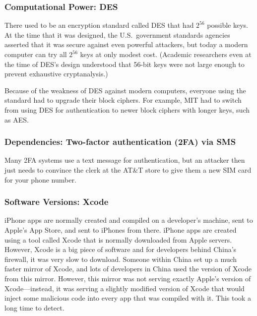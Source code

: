 \subsubsection{Computational Power: DES}
There used to be an encryption standard called DES that had $2^{56}$ possible keys.
At the time that it was designed, the U.S.~government standards agencies asserted that it was
secure against even powerful attackers,
but today a modern computer can try all $2^{56}$ keys at only modest cost.
(Academic researchers even at the time of DES's
design understood that 56-bit keys were not large
enough to prevent exhaustive
cryptanalysis.\cite{DH77})

Because of the weakness of DES against modern computers,
everyone using the standard had to upgrade their block ciphers.
For example, MIT had to switch from using DES for authentication 
to newer block ciphers with longer keys, such as AES.

\subsubsection{Dependencies: Two-factor authentication (2FA) via SMS}
Many 2FA systems use a text message for authentication, but an attacker then
just needs to convince the clerk at the AT\&T store to give them a new SIM card for your phone number.

\subsubsection{Software Versions: Xcode}\label{sec:intro:xcode}
iPhone apps are normally created and compiled on a developer's machine, sent to Apple's App Store, and sent to iPhones from there. iPhone apps are created using a tool called Xcode that is normally downloaded from Apple servers. However, Xcode is a big piece of software and for developers behind China's firewall, it was very slow to download. Someone within China set up a much faster mirror of Xcode, and lots of developers in China used the version of Xcode from this mirror. However, this mirror was not serving exactly Apple's version of Xcode---instead, it was serving a slightly modified version of Xcode that would inject some malicious code into every app that was compiled with it. This took a long time to detect.

